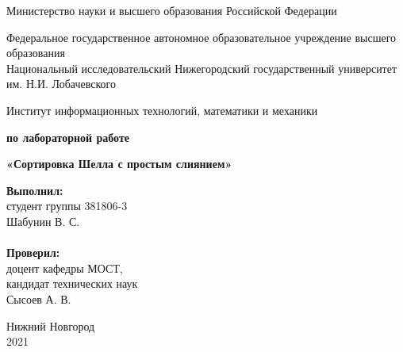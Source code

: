 \documentclass{report}
\begin{document}
	
	\begin{titlepage}
		
		\begin{center}
        Министерство науки и высшего образования Российской Федерации
        \end{center}

        \begin{center}
        Федеральное государственное автономное образовательное учреждение высшего образования \\
        Национальный исследовательский Нижегородский государственный университет им. Н.И. Лобачевского
        \end{center}

        \begin{center}
        Институт информационных технологий, математики и механики
        \end{center}
		
		\vspace{4em}
		
		\begin{center}
			\textbf{ по лабораторной работе} \\
		\end{center}
		\begin{center}
			\textbf{\Large«Сортировка Шелла с простым слиянием»} \\
		\end{center}
		
		\vspace{4em}
		
		\newbox{\lbox}
		\newlength{\maxl}
		\setlength{\maxl}{\wd\lbox}
		\hfill\parbox{5cm}{
			\hspace*{5cm}\hspace*{-5cm}\textbf{Выполнил:} \\ студент группы 381806-3 \\ Шабунин В. С.\\
			\\
			\hspace*{5cm}\hspace*{-5cm}\textbf{Проверил:}\\ доцент кафедры МОСТ, \\ кандидат технических наук \\ Сысоев А. В.\\}
		\vspace{\fill}
		
		\begin{center} Нижний Новгород \\ 2021 \end{center}
		
	\end{titlepage}
	
\end{document}
